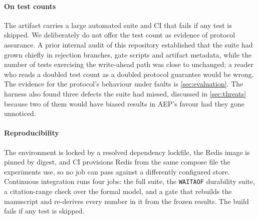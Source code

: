 \paragraph{On test counts} The artifact carries a large automated suite and CI
that fails if any test is skipped. We deliberately do not offer the test
count as evidence of protocol assurance. A prior internal audit of this
repository established that the suite had grown chiefly in rejection branches,
gate scripts and artifact metadata, while the number of tests exercising the
write-ahead path was close to unchanged; a reader who reads a doubled test
count as a doubled protocol guarantee would be wrong. The evidence for the
protocol's behaviour under faults is \cref{sec:evaluation}. The harness also
found three defects the suite had missed, discussed in \cref{sec:threats}
because two of them would have biased results in AEP's favour had they gone
unnoticed.

\paragraph{Reproducibility} The environment is locked by a resolved dependency
lockfile, the
Redis image is pinned by digest, and CI provisions Redis from the same compose
file the experiments use, so no job can pass against a differently configured
store. Continuous integration runs four jobs: the full suite, the
\texttt{WAITAOF} durability suite, a citation-range check over the formal
model, and a gate that rebuilds the manuscript and re-derives every number in
it from the frozen results. The build fails if any test is skipped.
